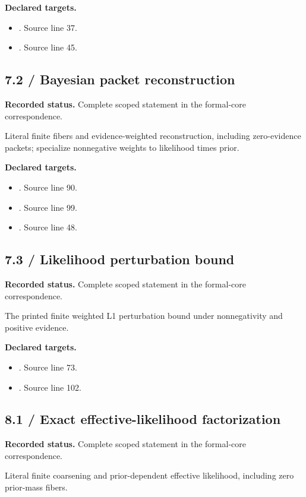 \textbf{Declared targets.}\begin{itemize}
\item {}. Source line 37.
\item {}. Source line 45.
\end{itemize}
\subsection{7.2 / Bayesian packet reconstruction}
\label{result:7.2}
\textbf{Recorded status.} Complete scoped statement in the formal-core correspondence.\par
Literal finite fibers and evidence-weighted reconstruction, including zero-evidence packets; specialize nonnegative weights to likelihood times prior.

\textbf{Declared targets.}\begin{itemize}
\item {}. Source line 90.
\item {}. Source line 99.
\item {}. Source line 48.
\end{itemize}
\subsection{7.3 / Likelihood perturbation bound}
\label{result:7.3}
\textbf{Recorded status.} Complete scoped statement in the formal-core correspondence.\par
The printed finite weighted L1 perturbation bound under nonnegativity and positive evidence.

\textbf{Declared targets.}\begin{itemize}
\item {}. Source line 73.
\item {}. Source line 102.
\end{itemize}
\subsection{8.1 / Exact effective-likelihood factorization}
\label{result:8.1}
\textbf{Recorded status.} Complete scoped statement in the formal-core correspondence.\par
Literal finite coarsening and prior-dependent effective likelihood, including zero prior-mass fibers.

